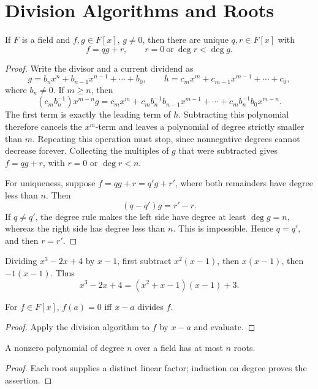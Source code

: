 \section{Division Algorithms and Roots}
\begin{theorem} If \(F\) is a field and \(f,g\in F[x]\),
\(g\ne0\), then there are unique \(q,r\in F[x]\) with
\[f=qg+r,\qquad r=0\ \text{or}\ \deg r<\deg g.\]
\end{theorem}
\begin{proof} Write the divisor and a current dividend as
\[
g=b_nx^n+b_{n-1}x^{n-1}+\cdots+b_0,
\qquad h=c_mx^m+c_{m-1}x^{m-1}+\cdots+c_0,
\]
where \(b_n\ne0\).  If \(m\ge n\), then
\[
(c_mb_n^{-1})x^{m-n}g
=c_mx^m+c_mb_n^{-1}b_{n-1}x^{m-1}+\cdots
+c_mb_n^{-1}b_0x^{m-n}.
\]
The first term is exactly the leading term of \(h\).  Subtracting this
polynomial therefore cancels the \(x^m\)-term and leaves a polynomial of
degree strictly smaller than \(m\).  Repeating this operation must stop,
since nonnegative degrees cannot decrease forever.  Collecting the multiples
of \(g\) that were subtracted gives \(f=qg+r\), with \(r=0\) or
\(\deg r<n\).

For uniqueness, suppose \(f=qg+r=q'g+r'\), where both remainders have
degree less than \(n\).  Then
\[
(q-q')g=r'-r.
\]
If \(q\ne q'\), the degree rule makes the left side have degree at least
\(\deg g=n\), whereas the right side has degree less than \(n\).  This is
impossible.  Hence \(q=q'\), and then \(r=r'\).
\end{proof}
\begin{example}
Dividing \(x^3-2x+4\) by \(x-1\), first subtract \(x^2(x-1)\), then
\(x(x-1)\), then \(-1(x-1)\).  Thus
\[x^3-2x+4=(x^2+x-1)(x-1)+3.\]
\end{example}
\begin{corollary} For \(f\in F[x]\), \(f(a)=0\) iff
\(x-a\) divides \(f\). \end{corollary}
\begin{proof} Apply the division algorithm to \(f\) by \(x-a\) and evaluate.
\end{proof}
\begin{corollary} A nonzero polynomial of degree \(n\) over a field has at
most \(n\) roots. \end{corollary}
\begin{proof} Each root supplies a distinct linear factor; induction on
degree proves the assertion. \end{proof}

